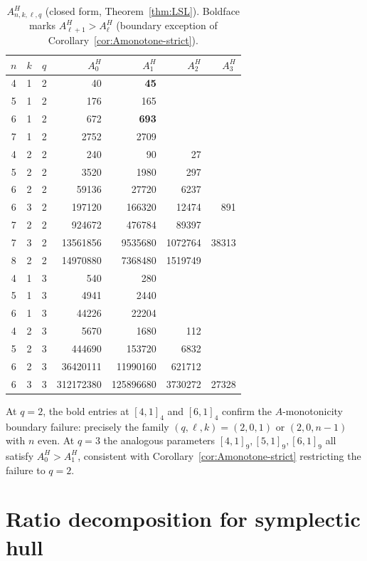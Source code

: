 \documentclass[11pt]{article}
\theoremstyle{plain}
\theoremstyle{remark}
\begin{document}
\begin{table}[h]
\centering
\caption{$A^H_{n,k,\ell,q}$ (closed form, Theorem~\ref{thm:LSL}).
Boldface marks $A^H_{\ell+1} > A^H_\ell$ (boundary exception of
Corollary~\ref{cor:Amonotone-strict}).}
\label{tab:hermitian-A}
\begin{tabular}{ccc|rrrr}
\toprule
$n$ & $k$ & $q$ & $A^H_0$ & $A^H_1$ & $A^H_2$ & $A^H_3$ \\
\midrule
4 & 1 & 2 & 40 & \textbf{45} &  & \\
5 & 1 & 2 & 176 & 165 &  & \\
6 & 1 & 2 & 672 & \textbf{693} &  & \\
7 & 1 & 2 & 2752 & 2709 &  & \\
4 & 2 & 2 & 240 & 90 & 27 & \\
5 & 2 & 2 & 3520 & 1980 & 297 & \\
6 & 2 & 2 & 59136 & 27720 & 6237 & \\
6 & 3 & 2 & 197120 & 166320 & 12474 & 891 \\
7 & 2 & 2 & 924672 & 476784 & 89397 & \\
7 & 3 & 2 & 13561856 & 9535680 & 1072764 & 38313 \\
8 & 2 & 2 & 14970880 & 7368480 & 1519749 & \\
\midrule
4 & 1 & 3 & 540 & 280 &  & \\
5 & 1 & 3 & 4941 & 2440 &  & \\
6 & 1 & 3 & 44226 & 22204 &  & \\
4 & 2 & 3 & 5670 & 1680 & 112 & \\
5 & 2 & 3 & 444690 & 153720 & 6832 & \\
6 & 2 & 3 & 36420111 & 11990160 & 621712 & \\
6 & 3 & 3 & 312172380 & 125896680 & 3730272 & 27328 \\
\bottomrule
\end{tabular}
\end{table}

At $q = 2$, the bold entries at $[4,1]_4$ and $[6,1]_4$ confirm the
$A$-monotonicity boundary failure: precisely the family
$(q, \ell, k) = (2, 0, 1)$ or $(2, 0, n-1)$ with $n$ even. At $q = 3$ the
analogous parameters $[4,1]_9, [5,1]_9, [6,1]_9$ all satisfy
$A^H_0 > A^H_1$, consistent with Corollary~\ref{cor:Amonotone-strict}
restricting the failure to $q = 2$.

\section{Ratio decomposition for symplectic hull}\label{sec:symp}
\end{document}

